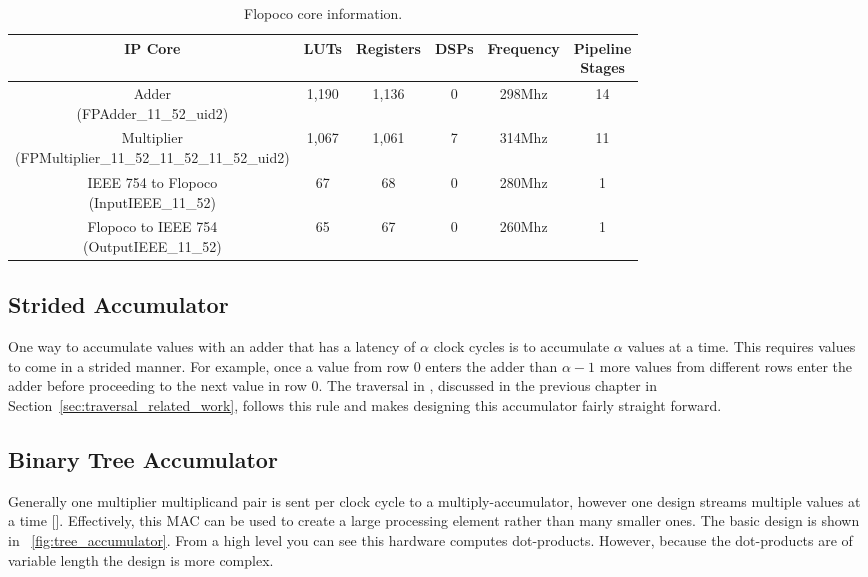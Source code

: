 \begin{table}
    \caption{Flopoco core information.}
    \label{tbl:flopoco}
    \begin{tabular}{|c|ccccc|}
        \hline
        IP Core & LUTs & Registers & DSPs & Frequency & \shortstack{Pipeline\\Stages} \\
        \hline
        \shortstack{Adder\\(FPAdder\_11\_52\_uid2)} & 1,190 & 1,136 & 0 & 298Mhz & 14 \\
        \hline
        \shortstack{Multiplier\\(FPMultiplier\_11\_52\_11\_52\_11\_52\_uid2)} & 1,067 & 1,061 & 7 & 314Mhz & 11 \\
        \hline
        \shortstack{IEEE 754 to Flopoco\\(InputIEEE\_11\_52)} & 67 & 68 & 0 & 280Mhz & 1 \\
        \hline
        \shortstack{Flopoco to IEEE 754\\(OutputIEEE\_11\_52)} & 65 & 67 & 0 & 260Mhz & 1 \\
        \hline
    \end{tabular}
\end{table}

\subsection{Strided Accumulator}
One way to accumulate values with an adder that has a latency of $\alpha$ clock cycles is to accumulate $\alpha$ values at a time. This requires values to come in a strided manner. For example, once a value from row 0 enters the adder than $\alpha - 1$ more values from different rows enter the adder before proceeding to the next value in row 0. The traversal in \cite{prelim:fowers}, discussed in the previous chapter in Section~\ref{sec:traversal_related_work}, follows this rule and makes designing this accumulator fairly straight forward.

\subsection{Binary Tree Accumulator}
Generally one multiplier multiplicand pair is sent per clock cycle to a multiply-accumulator, however one design streams multiple values at a time [\cite{prelim:sun2}]. Effectively, this MAC can be used to create a large processing element rather than many smaller ones. The basic design is shown in \figurename~\ref{fig:tree_accumulator}. From a high level you can see this hardware computes dot-products. However, because the dot-products are of variable length the design is more complex.

